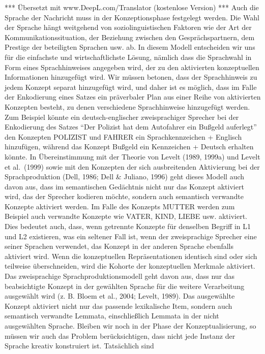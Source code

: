 \documentclass[
  letterpaper,
]{scrbook}
\begin{document}
*** Übersetzt mit www.DeepL.com/Translator (kostenlose Version) *** Auch
die Sprache der Nachricht muss in der Konzeptionsphase festgelegt
werden. Die Wahl der Sprache hängt weitgehend von soziolinguistischen
Faktoren wie der Art der Kommunikationssituation, der Beziehung zwischen
den Gesprächspartnern, dem Prestige der beteiligten Sprachen usw. ab. In
diesem Modell entscheiden wir uns für die einfachste und
wirtschaftlichste Lösung, nämlich dass die Sprachwahl in Form eines
Sprachhinweises angegeben wird, der zu den aktivierten konzeptuellen
Informationen hinzugefügt wird. Wir müssen betonen, dass der
Sprachhinweis zu jedem Konzept separat hinzugefügt wird, und daher ist
es möglich, dass im Falle der Enkodierung eines Satzes ein präverbaler
Plan aus einer Reihe von aktivierten Konzepten besteht, zu denen
verschiedene Sprachhinweise hinzugefügt werden. Zum Beispiel könnte ein
deutsch-englischer zweisprachiger Sprecher bei der Enkodierung des
Satzes ``Der Polizist hat dem Autofahrer ein Bußgeld auferlegt'' den
Konzepten POLIZIST und FAHRER ein Sprachkennzeichen + Englisch
hinzufügen, während das Konzept Bußgeld ein Kennzeichen + Deutsch
erhalten könnte. In Übereinstimmung mit der Theorie von Levelt (1989,
1999a) und Levelt et al.~(1999) sowie mit den Konzepten der sich
ausbreitenden Aktivierung bei der Sprachproduktion (Dell, 1986; Dell \&
Juliano, 1996) geht dieses Modell auch davon aus, dass im semantischen
Gedächtnis nicht nur das Konzept aktiviert wird, das der Sprecher
kodieren möchte, sondern auch semantisch verwandte Konzepte aktiviert
werden. Im Falle des Konzepts MUTTER werden zum Beispiel auch verwandte
Konzepte wie VATER, KIND, LIEBE usw. aktiviert. Dies bedeutet auch,
dass, wenn getrennte Konzepte für denselben Begriff in L1 und L2
existieren, was ein seltener Fall ist, wenn der zweisprachige Sprecher
eine seiner Sprachen verwendet, das Konzept in der anderen Sprache
ebenfalls aktiviert wird. Wenn die konzeptuellen Repräsentationen
identisch sind oder sich teilweise überschneiden, wird die Kohorte der
konzeptuellen Merkmale aktiviert. Das zweisprachige
Sprachproduktionsmodell geht davon aus, dass nur das beabsichtigte
Konzept in der gewählten Sprache für die weitere Verarbeitung ausgewählt
wird (z. B. Bloem et al., 2004; Levelt, 1989). Das ausgewählte Konzept
aktiviert nicht nur das passende lexikalische Item, sondern auch
semantisch verwandte Lemmata, einschließlich Lemmata in der nicht
ausgewählten Sprache. Bleiben wir noch in der Phase der
Konzeptualisierung, so müssen wir auch das Problem berücksichtigen, dass
nicht jede Instanz der Sprache kreativ konstruiert ist. Tatsächlich sind
\end{document}
